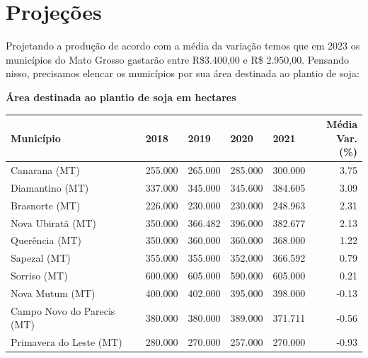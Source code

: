 \documentclass{article}
\begin{document}
\section*{Projeções}
Projetando a produção de acordo com a média da variação temos que em 2023 os municípios do Mato Grosso gastarão entre R\$3.400,00 e R\$ 2.950,00. Pensando nisso, precisamos elencar os municípios por sua área destinada ao plantio de soja:
\begin{center}
\textbf{Área destinada ao plantio de soja em hectares}
\begin{tabular}{|l|llllr|}
\hline
Município &      2018 &      2019 &      2020 &      2021 & \parbox[c]{1.5cm}{Média\\ Var. (\%)} \\
\hline
Canarana (MT)              & 255.000 & 265.000 & 285.000 & 300.000 &           3.75 \\
Diamantino (MT)            & 337.000 & 345.000 & 345.600 & 384.605 &           3.09 \\
Brasnorte (MT)             & 226.000 & 230.000 & 230.000 & 248.963 &           2.31 \\
Nova Ubiratã (MT)          & 350.000 & 366.482 & 396.000 & 382.677 &           2.13 \\
Querência (MT)             & 350.000 & 360.000 & 360.000 & 368.000 &           1.22 \\
Sapezal (MT)               & 355.000 & 355.000 & 352.000 & 366.592 &           0.79 \\
Sorriso (MT)               & 600.000 & 605.000 & 590.000 & 605.000 &           0.21 \\
Nova Mutum (MT)            & 400.000 & 402.000 & 395.000 & 398.000 &          -0.13 \\
Campo Novo do Parecis (MT) & 380.000 & 380.000 & 389.000 & 371.711 &          -0.56 \\
Primavera do Leste (MT)    & 280.000 & 270.000 & 257.000 & 270.000 &          -0.93 \\
\hline
\end{tabular}
\end{center}
\end{document}
